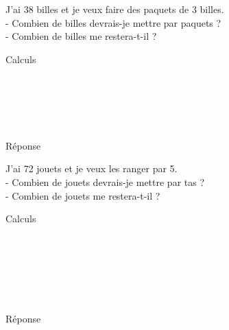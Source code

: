 \documentclass[11pt]{article}
\begin{document}
\begin{multicols}{2}
\begin{exercice}[1]
J'ai 38 billes et je veux faire des paquets de 3 billes. \\
- Combien de billes devrais-je mettre par paquets ? \\
- Combien de billes me restera-t-il ?
\renewcommand{\columnseprule}{1pt}
\begin{multicols}{2}
\begin{center}
Calculs
\end{center}
\phantom{0} \\ \phantom{0} \\ \phantom{0} \\ \phantom{0} \\
\columnbreak
\begin{center}
Réponse
\end{center}
\end{multicols}
\end{exercice}

\begin{exercice}[1]
J'ai 72 jouets et je veux les ranger par 5.\\
- Combien de jouets devrais-je mettre par tas ?\\
- Combien de jouets me restera-t-il ?
\renewcommand{\columnseprule}{1pt}
\begin{multicols}{2}
\begin{center}
Calculs
\end{center}
\phantom{0} \\ \phantom{0} \\ \phantom{0} \\ \phantom{0} \\
\phantom{0} \\ 
\columnbreak
\begin{center}
Réponse
\end{center}
\end{multicols}
\end{exercice}
\end{multicols}
\end{document}

